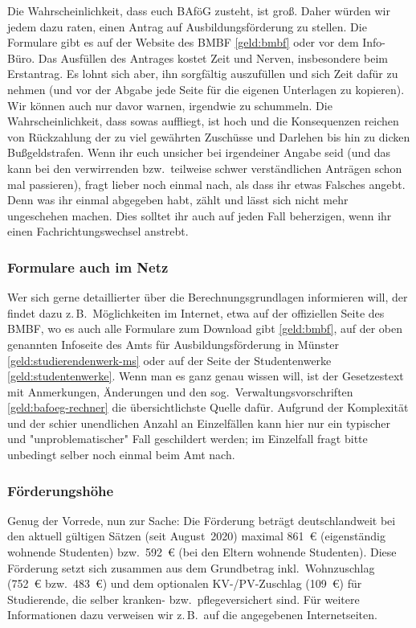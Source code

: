\begin{multicols*}{2}
Die Wahrscheinlichkeit, dass euch BAföG zusteht, ist groß.
Daher würden wir jedem dazu raten, einen Antrag auf Ausbildungsförderung zu stellen.
Die Formulare gibt es auf der Website des BMBF \cref{geld:bmbf} oder vor dem Info-Büro.
Das Ausfüllen des Antrages kostet Zeit und Nerven, insbesondere beim Erstantrag.
Es lohnt sich aber, ihn sorgfältig auszufüllen und sich Zeit dafür zu nehmen (und vor der Abgabe jede Seite für die eigenen Unterlagen zu kopieren).
Wir können auch nur davor warnen, irgendwie zu schummeln.
Die Wahrscheinlichkeit, dass sowas auffliegt, ist hoch und die Konsequenzen reichen von Rückzahlung der zu viel gewährten Zuschüsse und Darlehen bis hin zu dicken Bußgeldstrafen.
Wenn ihr euch unsicher bei irgendeiner Angabe seid (und das kann bei den verwirrenden bzw.\ teilweise schwer verständlichen Anträgen schon mal passieren), fragt lieber noch einmal nach, als dass ihr etwas Falsches angebt.
Denn was ihr einmal abgegeben habt, zählt und lässt sich nicht mehr ungeschehen machen.
Dies solltet ihr auch auf jeden Fall beherzigen, wenn ihr einen Fachrichtungswechsel anstrebt.

\subsubsection{Formulare auch im Netz}
Wer sich gerne detaillierter über die Berechnungsgrundlagen informieren will, der findet dazu z.\,B.\ Möglichkeiten im Internet, etwa auf der offiziellen Seite des BMBF, wo es auch alle Formulare zum Download gibt \cref{geld:bmbf}, auf der oben genannten Infoseite des Amts für Ausbildungsförderung in Münster \cref{geld:studierendenwerk-ms} oder auf der Seite der Studentenwerke \cref{geld:studentenwerke}.
Wenn man es ganz genau wissen will, ist der Gesetzestext mit Anmerkungen, Änderungen und den sog.\ Verwaltungsvorschriften \cref{geld:bafoeg-rechner} die übersichtlichste Quelle dafür.
Aufgrund der Komplexität und der schier unendlichen Anzahl an Einzelfällen kann hier nur ein typischer und "unproblematischer" Fall geschildert werden; im Einzelfall fragt bitte unbedingt selber noch einmal beim Amt nach.

\subsubsection{Förderungshöhe}
Genug der Vorrede, nun zur Sache: Die Förderung beträgt deutschlandweit bei den aktuell gültigen Sätzen (seit August~2020) maximal \SI{861}{\euro} (eigenständig wohnende Studenten) bzw.\ \SI{592}{\euro} (bei den Eltern wohnende Studenten).
Diese Förderung setzt sich zusammen aus dem Grundbetrag inkl.\ Wohnzuschlag (\SI{752}{\euro} bzw.\ \SI{483}{\euro}) und dem optionalen KV-/PV-Zuschlag (\SI{109}{\euro}) für Studierende, die selber kranken- bzw.\ pflegeversichert sind.
Für weitere Informationen dazu verweisen wir z.\,B.\ auf die angegebenen Internetseiten.


\end{multicols*}
